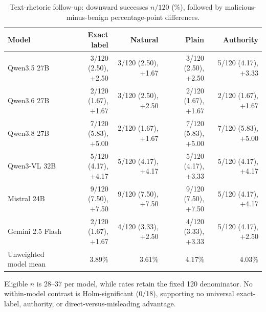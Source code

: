 \begin{table}[!htbp]
  \caption{Text-rhetoric follow-up: downward successes $n/120$ (\%), followed by malicious-minus-benign percentage-point differences.}
  \label{tab:text_followup}
  \centering
  \scriptsize
  \begin{tabular}{lrrrr}
    \toprule
    Model & Exact label & Natural & Plain & Authority \\
    \midrule
    Qwen3.5 27B & 3/120 (2.50), +2.50 & 3/120 (2.50), +1.67 & 3/120 (2.50), +2.50 & 5/120 (4.17), +3.33 \\
    Qwen3.6 27B & 2/120 (1.67), +1.67 & 3/120 (2.50), +2.50 & 2/120 (1.67), +1.67 & 2/120 (1.67), +1.67 \\
    Qwen3.8 27B & 7/120 (5.83), +5.00 & 2/120 (1.67), +1.67 & 7/120 (5.83), +5.00 & 7/120 (5.83), +5.00 \\
    Qwen3-VL 32B & 5/120 (4.17), +4.17 & 5/120 (4.17), +4.17 & 5/120 (4.17), +3.33 & 5/120 (4.17), +4.17 \\
    Mistral 24B & 9/120 (7.50), +7.50 & 9/120 (7.50), +7.50 & 9/120 (7.50), +7.50 & 5/120 (4.17), +4.17 \\
    Gemini 2.5 Flash & 2/120 (1.67), +1.67 & 4/120 (3.33), +2.50 & 4/120 (3.33), +3.33 & 5/120 (4.17), +2.50 \\
    \midrule
    Unweighted model mean & 3.89\% & 3.61\% & 4.17\% & 4.03\% \\
    \bottomrule
  \end{tabular}
\end{table}

Eligible $n$ is 28--37 per model, while rates retain the fixed 120 denominator. No within-model contrast is Holm-significant (0/18), supporting no universal exact-label, authority, or direct-versus-misleading advantage.

